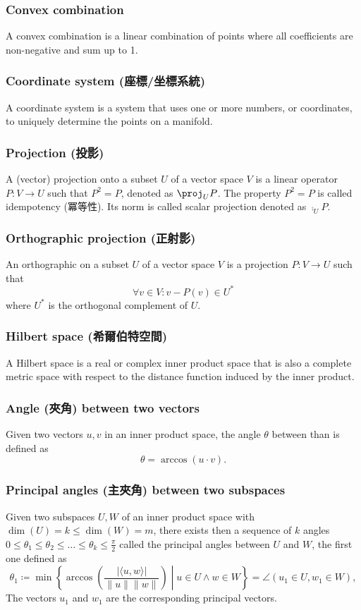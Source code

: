 \documentclass[a4paper,12pt]{report}
\begin{document}
\subsubsection{Convex combination}
A convex combination is a linear combination of points where all coefficients are non-negative and sum up to 1.
\subsubsection{Coordinate system (座標/坐標系統)}
A coordinate system is a system that uses one or more numbers, or coordinates, to uniquely determine the points on a manifold.
\subsubsection{Projection (投影)}
A (vector) projection onto a subset $U$ of a vector space $V$ is a linear operator $P\colon V\to U$ such that $P^2=P$, denoted as $\proj_UP$. The property $P^2=P$ is called idempotency (冪等性). Its norm is called scalar projection denoted as $\comp_UP$.
\subsubsection{Orthographic projection (正射影)}
An orthographic on a subset $U$ of a vector space $V$ is a projection $P\colon V\to U$  such that 
\[ \forall v\in V\colon v - P(v)\in U^*\]
where $U^*$ is the orthogonal complement of \( U \).
\subsubsection{Hilbert space (希爾伯特空間)}
A Hilbert space is a real or complex inner product space that is also a complete metric space with respect to the distance function induced by the inner product.
\subsubsection{Angle (夾角) between two vectors}
Given two vectors $u,v$ in an inner product space, the angle $\theta$ between than is defined as
\[\theta=\arccos(u\cdot v).\]
\subsubsection{Principal angles (主夾角) between two subspaces}
Given two subspaces $U,W$ of an inner product space with $\dim(U)=k\leq\dim(W)=m$, there exists then a sequence of $k$ angles $0\leq\theta_1\leq\theta_2\leq\ldots\leq\theta_k\leq\frac{\pi}{2}$ called the principal angles between $U$ and $W$, the first one defined as
\[\theta_1\coloneq\min\left\{\arccos\left(\frac{|\langle u,w\rangle|}{\|u\|\|w\|}\right)\middle |u\in U\land w\in W\right\}=\angle(u_1\in U,w_1\in W),\]
The vectors $u_1$ and $w_1$ are the corresponding principal vectors.
\end{document}
